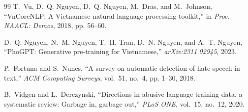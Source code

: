 \documentclass[conference]{IEEEtran}
\begin{document}
\begin{thebibliography}{99}
T.~Vu, D.~Q. Nguyen, D.~Q. Nguyen, M.~Dras, and M.~Johnson, ``VnCoreNLP: A
Vietnamese natural language processing toolkit,'' in \textit{Proc. NAACL: Demos},
2018, pp. 56--60.

D.~Q. Nguyen, N.~M. Nguyen, T.~H. Tran, D.~N. Nguyen, and A.~T. Nguyen, ``PhoGPT:
Generative pre-training for Vietnamese,'' \textit{arXiv:2311.02945}, 2023.

P.~Fortuna and S.~Nunes, ``A survey on automatic detection of hate speech in text,''
\textit{ACM Computing Surveys}, vol.~51, no.~4, pp. 1--30, 2018.

B.~Vidgen and L.~Derczynski, ``Directions in abusive language training data, a
systematic review: Garbage in, garbage out,'' \textit{PLoS ONE}, vol.~15, no.~12,
2020.

\end{thebibliography}
\end{document}
